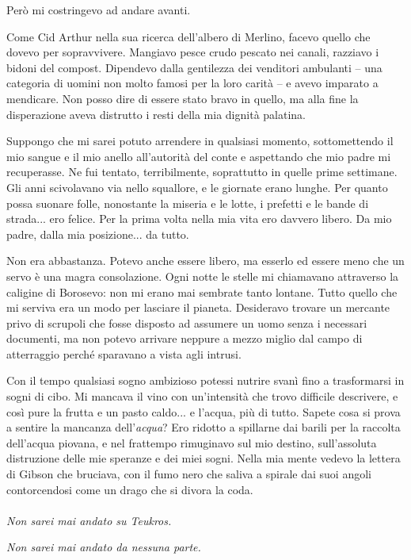 Però mi costringevo ad andare avanti.

Come Cid Arthur nella sua ricerca dell'albero di Merlino, facevo quello
che dovevo per sopravvivere. Mangiavo pesce crudo pescato nei canali,
razziavo i bidoni del compost. Dipendevo dalla gentilezza dei venditori
ambulanti -- una categoria di uomini non molto famosi per la loro carità
-- e avevo imparato a mendicare. Non posso dire di essere stato bravo in
quello, ma alla fine la disperazione aveva distrutto i resti della mia
dignità palatina.

Suppongo che mi sarei potuto arrendere in qualsiasi momento,
sottomettendo il mio sangue e il mio anello all'autorità del conte e
aspettando che mio padre mi recuperasse. Ne fui tentato, terribilmente,
soprattutto in quelle prime settimane. Gli anni scivolavano via nello
squallore, e le giornate erano lunghe. Per quanto possa suonare folle,
nonostante la miseria e le lotte, i prefetti e le bande di strada... ero
felice. Per la prima volta nella mia vita ero davvero libero. Da mio
padre, dalla mia posizione... da tutto.

Non era abbastanza. Potevo anche essere libero, ma esserlo ed essere
meno che un servo è una magra consolazione. Ogni notte le stelle mi
chiamavano attraverso la caligine di Borosevo: non mi erano mai sembrate
tanto lontane. Tutto quello che mi serviva era un modo per lasciare il
pianeta. Desideravo trovare un mercante privo di scrupoli che fosse
disposto ad assumere un uomo senza i necessari documenti, ma non potevo
arrivare neppure a mezzo miglio dal campo di atterraggio perché
sparavano a vista agli intrusi.

Con il tempo qualsiasi sogno ambizioso potessi nutrire svanì fino a
trasformarsi in sogni di cibo. Mi mancava il vino con un'intensità che
trovo difficile descrivere, e così pure la frutta e un pasto caldo... e
l'acqua, più di tutto. Sapete cosa si prova a sentire la mancanza
dell'\emph{acqua}? Ero ridotto a spillarne dai barili per la raccolta
dell'acqua piovana, e nel frattempo rimuginavo sul mio destino,
sull'assoluta distruzione delle mie speranze e dei miei sogni. Nella mia
mente vedevo la lettera di Gibson che bruciava, con il fumo nero che
saliva a spirale dai suoi angoli contorcendosi come un drago che si
divora la coda.
\leavevmode\\
\leavevmode\\
\textit{Non sarei mai andato su Teukros.}

\textit{Non sarei mai andato da nessuna parte.}


